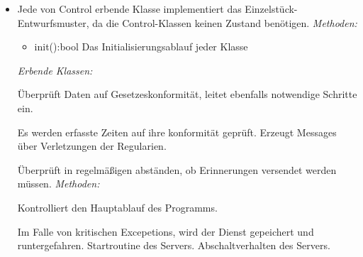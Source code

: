         \begin{itemize}
            \item Jede von Control erbende Klasse implementiert das Einzelstück-Entwurfsmuster, da die Control-Klassen keinen Zustand benötigen.
                \emph{Methoden:}
                \begin{itemize}
                    \item{init():bool}
                        Das Initialisierungsablauf jeder Klasse
                \end{itemize}
                \emph{Erbende Klassen:}
                \begin{itemize}
                       Überprüft Daten auf Gesetzeskonformität, leitet ebenfalls notwendige Schritte ein.
                       \begin{itemize}
                            Es werden erfasste Zeiten auf ihre konformität geprüft.
                            Erzeugt Messages über Verletzungen der Regularien.
                       \end{itemize}

                        Überprüft in regelmäßigen abständen, ob Erinnerungen versendet werden müssen.
                        \emph{Methoden:}
                        \begin{itemize}
                        \end{itemize}

                        Kontrolliert den Hauptablauf des Programms.
                        \begin{itemize}
                                Im Falle von kritischen Excepetions, wird der Dienst gepeichert und runtergefahren.
                                Startroutine des Servers.
                                Abschaltverhalten des Servers.
                        \end{itemize}


\end{itemize}
\end{itemize}

